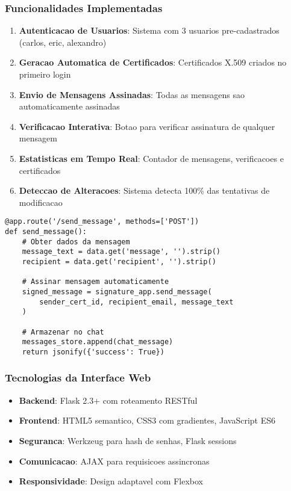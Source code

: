 \documentclass[12pt,a4paper,oneside]{article}
\begin{document}
\subsubsection{Funcionalidades Implementadas}

\begin{enumerate}
    \item \textbf{Autenticacao de Usuarios}: Sistema com 3 usuarios pre-cadastrados (carlos, eric, alexandro)
    \item \textbf{Geracao Automatica de Certificados}: Certificados X.509 criados no primeiro login
    \item \textbf{Envio de Mensagens Assinadas}: Todas as mensagens sao automaticamente assinadas
    \item \textbf{Verificacao Interativa}: Botao para verificar assinatura de qualquer mensagem
    \item \textbf{Estatisticas em Tempo Real}: Contador de mensagens, verificacoes e certificados
    \item \textbf{Deteccao de Alteracoes}: Sistema detecta 100\% das tentativas de modificacao
\end{enumerate}

\begin{lstlisting}[caption=Estrutura da aplicacao Flask]
@app.route('/send_message', methods=['POST'])
def send_message():
    # Obter dados da mensagem
    message_text = data.get('message', '').strip()
    recipient = data.get('recipient', '').strip()
    
    # Assinar mensagem automaticamente
    signed_message = signature_app.send_message(
        sender_cert_id, recipient_email, message_text
    )
    
    # Armazenar no chat
    messages_store.append(chat_message)
    return jsonify({'success': True})
\end{lstlisting}

\subsubsection{Tecnologias da Interface Web}

\begin{itemize}
    \item \textbf{Backend}: Flask 2.3+ com roteamento RESTful
    \item \textbf{Frontend}: HTML5 semantico, CSS3 com gradientes, JavaScript ES6
    \item \textbf{Seguranca}: Werkzeug para hash de senhas, Flask sessions
    \item \textbf{Comunicacao}: AJAX para requisicoes assincronas
    \item \textbf{Responsividade}: Design adaptavel com Flexbox
\end{itemize}
\end{document}
